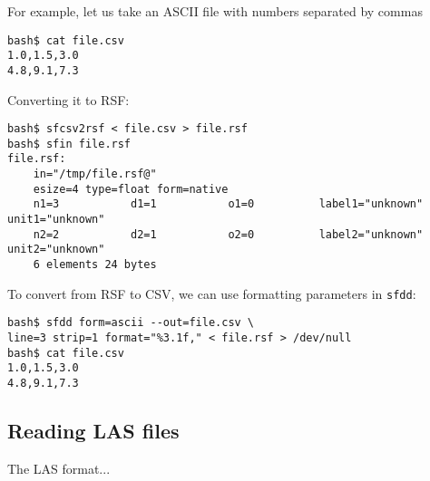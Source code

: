 For example, let us take an ASCII file with numbers separated by commas
\begin{verbatim}
bash$ cat file.csv
1.0,1.5,3.0
4.8,9.1,7.3
\end{verbatim}
Converting it to RSF:
\begin{verbatim}
bash$ sfcsv2rsf < file.csv > file.rsf
bash$ sfin file.rsf
file.rsf:
    in="/tmp/file.rsf@"
    esize=4 type=float form=native 
    n1=3           d1=1           o1=0          label1="unknown" unit1="unknown" 
    n2=2           d2=1           o2=0          label2="unknown" unit2="unknown" 
	6 elements 24 bytes
\end{verbatim}

To convert from RSF to CSV, we can use formatting parameters in \texttt{sfdd}:
\begin{verbatim}
bash$ sfdd form=ascii --out=file.csv \
line=3 strip=1 format="%3.1f," < file.rsf > /dev/null
bash$ cat file.csv
1.0,1.5,3.0
4.8,9.1,7.3
\end{verbatim}

\subsection{Reading LAS files}

The LAS format...



